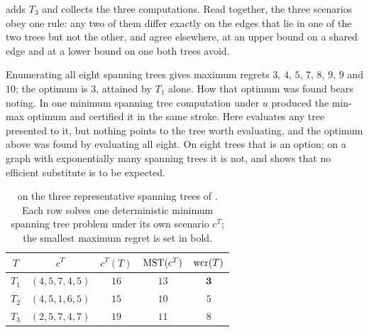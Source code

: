  adds $T_3$ and collects the three computations.
Read together, the three scenarios obey one rule: any two of them differ exactly on the edges that lie in one of the two trees but not the other, and agree elsewhere, at an upper bound on a shared edge and at a lower bound on one both trees avoid.

Enumerating all eight spanning trees gives maximum regrets $3$, $4$, $5$, $7$, $8$, $9$, $9$ and $10$; the optimum is $3$, attained by $T_1$ alone.
How that optimum was found bears noting.
In  one minimum spanning tree computation under $u$ produced the min-max optimum and certified it in the same stroke.
Here  evaluates any tree presented to it, but nothing points to the tree worth evaluating, and the optimum above was found by evaluating all eight.
On eight trees that is an option; on a graph with exponentially many spanning trees it is not, and  shows that no efficient substitute is to be expected.

\begin{table}[htbp]
\centering
\caption{ on the three representative spanning trees of . Each row solves one deterministic minimum spanning tree problem under its own scenario $c^{T}$; the smallest maximum regret is set in bold.}
\label{tab:micro-graph-regret}
\begin{tabular}{c c c c c}
\toprule
$T$ & $c^{T}$ & $c^{T}(T)$ & $\mathrm{MST}(c^{T})$ & $\mathrm{wcr}(T)$ \\
\midrule
$T_1$ & $(4, 5, 7, 4, 5)$ & $16$ & $13$ & $\mathbf{3}$ \\
$T_2$ & $(4, 5, 1, 6, 5)$ & $15$ & $10$ & $5$ \\
$T_3$ & $(2, 5, 7, 4, 7)$ & $19$ & $11$ & $8$ \\
\bottomrule
\end{tabular}
\end{table}

